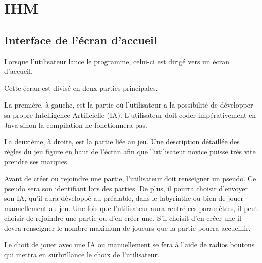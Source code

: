 \chapter{IHM}

\section{Interface de l'écran d'accueil}
	Lorsque l'utilisateur lance le programme, celui-ci est dirigé vers un écran d'accueil.

	\color{red}
	Cette écran est divisé en deux parties principales.

	La première, à gauche, est la partie où l'utilisateur a la possibilité de développer sa propre Intelligence Artificielle (IA). L'utilisateur doit coder impérativement en Java sinon la compilation ne fonctionnera pas.

	La deuxième, à droite, est la partie liée au jeu. Une description détaillée des règles du jeu figure en haut de l'écran afin que l'utilisateur novice puisse très vite prendre ses marques.

	\color{black}
	Avant de créer ou rejoindre une partie, l'utilisateur doit renseigner un pseudo. Ce pseudo sera son identifiant lors des parties. De plus, il pourra choisir d'envoyer son IA, qu'il aura développé au préalable, dans le labyrinthe ou bien de jouer manuellement au jeu. Une fois que l'utilisateur aura rentré ces paramètres, il peut choisir de rejoindre une partie ou d'en créer une. S'il choisit d'en créer une il devra renseigner le nombre maximum de joueurs que la partie pourra accueillir.

	Le choit de jouer avec une IA ou manuellement se fera à l'aide de radios boutons qui mettra en surbrillance le choix de l'utilisateur.

